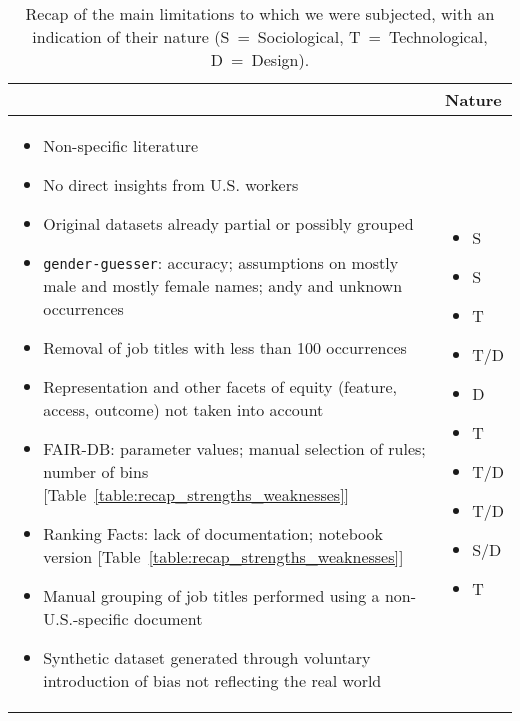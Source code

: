 \begin{table}[t!]
\begin{tabularx}{\columnwidth}{|>{\RaggedRight\arraybackslash}Y>{\centering\arraybackslash}p{1.5cm}|}
\hline
{} & \textbf{Nature}\\
\hline
\begin{itemize}[noitemsep,topsep=0pt,parsep=0pt,partopsep=0pt,leftmargin=*]
\item Non-specific literature
\item No direct insights from U.S. workers
\item Original datasets already partial or possibly grouped
\item \texttt{gender-guesser}: accuracy; assumptions on mostly male and mostly female names; andy and unknown occurrences
\item Removal of job titles with less than 100 occurrences
\item Representation and other facets of equity (feature, access, outcome) not taken into account
\item FAIR-DB: parameter values; manual selection of rules; number of bins [Table~\ref{table:recap_strengths_weaknesses}]
\item Ranking Facts: lack of documentation; notebook version [Table~\ref{table:recap_strengths_weaknesses}]
\item Manual grouping of job titles performed using a non-U.S.-specific document
\item Synthetic dataset generated through voluntary introduction of bias not reflecting the real world
\end{itemize} & \begin{itemize}[label={},noitemsep,topsep=0pt,parsep=0pt,partopsep=0pt,leftmargin=*]
\centering
\item S
\item S
\item T
\item T/D\vspace{\baselineskip}
\item D
\item T\vspace{\baselineskip}
\item T/D\vspace{\baselineskip}
\item T/D\vspace{\baselineskip}
\item S/D\vspace{\baselineskip}
\item T
\end{itemize}\\
\hline
\end{tabularx}
\centering
\caption{Recap of the main limitations to which we were subjected, with an indication of their nature (S~=~Sociological, T~=~Technological, D~=~Design).}
\label{table:recap_limitations}
\end{table}

